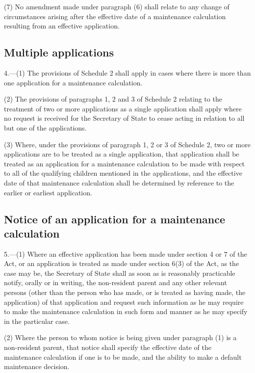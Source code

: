 \documentclass[12pt,a4paper]{article}
\begin{document}
(7) No amendment made under paragraph (6) shall relate to any change of circumstances arising after the effective date of a maintenance calculation resulting from an effective application.

\subsection[4. Multiple applications]{Multiple applications}

4.---(1)  The provisions of Schedule 2 shall apply in cases where there is more than one application for a maintenance calculation.

(2) The provisions of paragraphs 1, 2 and 3 of Schedule 2 relating to the treatment of two or more applications as a single application shall apply where no request is received for the Secretary of State to cease acting in relation to all but one of the applications.

(3) Where, under the provisions of paragraph 1, 2 or 3 of Schedule 2, two or more applications are to be treated as a single application, that application shall be treated as an application for a maintenance calculation to be made with respect to all of the qualifying children mentioned in the applications, and the effective date of that maintenance calculation shall be determined by reference to the earlier or earliest application.

\subsection[5. Notice of an application for a maintenance calculation]{Notice of an application for a maintenance calculation}

5.---(1)  Where an effective application has been made under section 4 or 7 of the Act, or 
an application  %
is treated as made under section 6(3) of the Act, as the case may be, the Secretary of State shall as soon as is reasonably practicable notify, orally or in writing, the non-resident parent and any other relevant persons (other than the person who has made, or is treated as having made, the application) of that application and request such information as he may require to make the maintenance calculation in such form and manner as he may specify in the particular case.

(2) Where the person to whom notice is being given under paragraph (1) is a non-resident parent, that notice shall specify the effective date of the maintenance calculation if one is to be made, and the ability to make a default maintenance decision.
\end{document}

